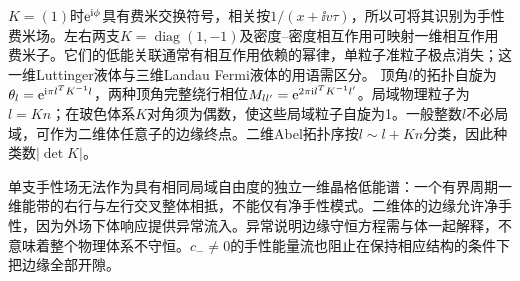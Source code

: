 $K=(1)$时$\mathrm e^{\mathrm i\phi}$具有费米交换符号，相关按$1/(x+\ii v\tau)$，所以可将其识别为手性费米场。左右两支$K=\operatorname{diag}(1,-1)$及密度--密度相互作用可映射一维相互作用费米子。它们的低能关联通常有相互作用依赖的幂律，单粒子准粒子极点消失；这一维Luttinger液体与三维Landau Fermi液体的用语需区分。
顶角$l$的拓扑自旋为$\theta_l=\mathrm e^{\mathrm i\pi l^TK^{-1}l}$，两种顶角完整绕行相位$M_{ll'}=\mathrm e^{2\pi\mathrm i l^TK^{-1}l'}$。局域物理粒子为$l=Kn$；在玻色体系$K$对角须为偶数，使这些局域粒子自旋为1。一般整数$l$不必局域，可作为二维体任意子的边缘终点。二维Abel拓扑序按$l\sim l+Kn$分类，因此种类数$|\det K|$。

单支手性场无法作为具有相同局域自由度的独立一维晶格低能谱：一个有界周期一维能带的右行与左行交叉整体相抵，不能仅有净手性模式。二维体的边缘允许净手性，因为外场下体响应提供异常流入。异常说明边缘守恒方程需与体一起解释，不意味着整个物理体系不守恒。$c_-\ne0$的手性能量流也阻止在保持相应结构的条件下把边缘全部开隙。
